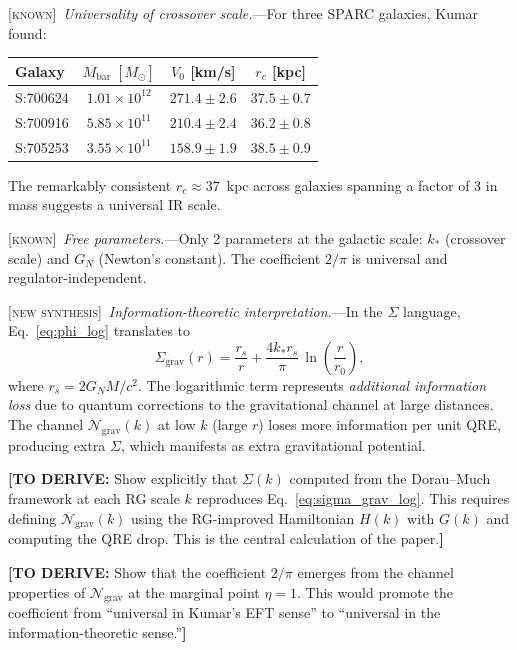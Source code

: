 \documentclass[prl,twocolumn,superscriptaddress,longbibliography,floatfix]{revtex4-2}
\newcommand{\chan}{\mathcal{N}}
\newcommand{\known}{\textsc{[known]}}
\newcommand{\newsyn}{\textsc{[new synthesis]}}
\newcommand{\toderive}[1]{{\color{red}\textbf{[TO DERIVE:} #1\textbf{]}}}
\begin{document}
\known\ \emph{Universality of crossover scale.}---For three SPARC
galaxies, Kumar~\cite{Kumar2025} found:
\begin{center}
\begin{tabular}{lccc}
\toprule
Galaxy & $M_{\mathrm{bar}}\;[M_\odot]$ & $V_0$ [km/s]
  & $r_c$ [kpc] \\
\midrule
S:700624 & $1.01 \times 10^{12}$ & $271.4 \pm 2.6$ & $37.5 \pm 0.7$ \\
S:700916 & $5.85 \times 10^{11}$ & $210.4 \pm 2.4$ & $36.2 \pm 0.8$ \\
S:705253 & $3.55 \times 10^{11}$ & $158.9 \pm 1.9$ & $38.5 \pm 0.9$ \\
\bottomrule
\end{tabular}
\end{center}
The remarkably consistent $r_c \approx 37$~kpc across galaxies
spanning a factor of 3 in mass suggests a universal IR scale.

\known\ \emph{Free parameters.}---Only 2 parameters at the
galactic scale: $k_*$ (crossover scale) and $G_N$ (Newton's
constant). The coefficient $2/\pi$ is universal and
regulator-independent.

\newsyn\ \emph{Information-theoretic interpretation.}---In the
$\Sigma$ language, Eq.~\eqref{eq:phi_log} translates to
\begin{equation}
\Sigma_{\mathrm{grav}}(r) = \frac{r_s}{r}
  + \frac{4k_* r_s}{\pi}\,\ln\!\left(\frac{r}{r_0}\right),
\label{eq:sigma_grav_log}
\end{equation}
where $r_s = 2G_N M/c^2$. The logarithmic term represents
\emph{additional information loss} due to quantum corrections
to the gravitational channel at large distances. The channel
$\chan_{\mathrm{grav}}(k)$ at low $k$ (large $r$) loses more
information per unit QRE, producing extra $\Sigma$, which
manifests as extra gravitational potential.

\toderive{Show explicitly that $\Sigma(k)$ computed from the
Dorau--Much framework at each RG scale $k$ reproduces
Eq.~\eqref{eq:sigma_grav_log}. This requires defining
$\chan_{\mathrm{grav}}(k)$ using the RG-improved Hamiltonian
$H(k)$ with $G(k)$ and computing the QRE drop. This is the
central calculation of the paper.}

\toderive{Show that the coefficient $2/\pi$ emerges from the
channel properties of $\chan_{\mathrm{grav}}$ at the marginal
point $\eta = 1$. This would promote the coefficient from
``universal in Kumar's EFT sense'' to ``universal in the
information-theoretic sense.''}
\end{document}
